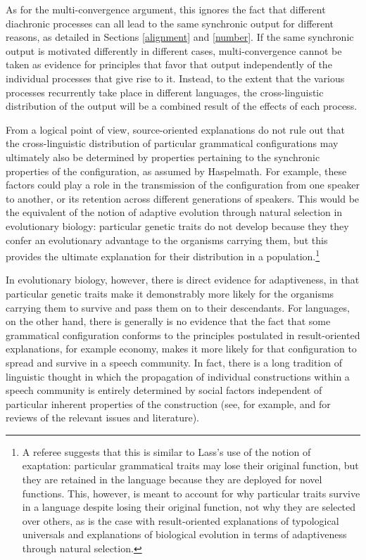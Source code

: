 \documentclass[output=paper]{langsci/langscibook}
\begin{document}
As for the multi-convergence argument, this
ignores the fact that different
diachronic processes can all lead to the same synchronic output for
different reasons, as detailed in Sections \ref{alignment} and
\ref{number}. If the same synchronic output is motivated
differently in different cases, multi-convergence cannot be taken as
evidence for principles that favor that output
independently of the individual processes that give rise to
it. Instead, to the extent that the various processes recurrently take place in
different languages, the cross-linguistic distribution of the output
will be a combined result of the effects of each process. 

From a logical point of view, source-oriented explanations do not rule
out that the cross-linguistic distribution of particular grammatical
configurations may ultimately also be determined by properties
pertaining to the synchronic properties of the configuration, as
assumed by Haspelmath. For example,  these factors could play a role in
the transmission of the configuration from one speaker to another, or
its retention across different generations of speakers. This would be
the equivalent of the notion of adaptive evolution through natural
selection in evolutionary
biology: particular genetic traits do not develop because they
they confer an evolutionary advantage to the organisms
carrying them, but this provides the ultimate explanation for their
distribution in a population.\footnote{A referee suggests that this is
  similar to Lass's \citeyear{Lass1990} use of the notion of
  exaptation: particular grammatical traits may lose their original
  function, but they are retained in the language because they are
  deployed for novel functions.  This, however, is meant to account for why
  particular traits  survive in a language despite losing their
  original function, not why they are
  selected over others, as is the case with  result-oriented
  explanations of typological universals and explanations of
  biological evolution in terms of adaptiveness through natural selection.}

In evolutionary biology, however, there is direct evidence for
adaptiveness, in that particular genetic traits make it  demonstrably more likely for the organisms
carrying them to survive and pass them on to their
descendants. For languages, on the other hand, there is generally is no evidence that the
fact that some grammatical configuration conforms to the principles
postulated in result-oriented explanations, for example economy, makes 
it more likely for that configuration to spread and survive in a
speech community. In fact, there is a long tradition of
linguistic thought in which the propagation of individual
constructions within  a speech community is entirely determined by
social factors independent of particular inherent properties of the
construction (see, for example, \citealt{McMahon1994}
and \citealt{BillLC} for reviews of the relevant issues and
literature). 
\end{document}
